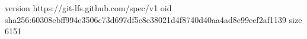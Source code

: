 version https://git-lfs.github.com/spec/v1
oid sha256:60308ebff994e3506c73d697df5e8e38021d4f8740d40aa4ad8e99eef2af1139
size 6151
